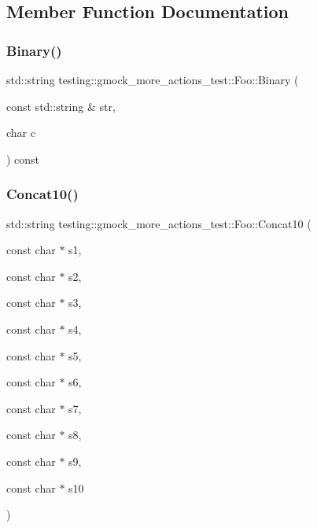 \subsection{Member Function Documentation}
\mbox{\label{classtesting_1_1gmock__more__actions__test_1_1Foo_a8ee56742c6c025af680617464c71ecef}} 
\subsubsection{\texorpdfstring{Binary()}{Binary()}}
{\footnotesize\ttfamily std\+::string testing\+::gmock\+\_\+more\+\_\+actions\+\_\+test\+::\+Foo\+::\+Binary (\begin{DoxyParamCaption}\item[{const std\+::string \&}]{str,  }\item[{char}]{c }\end{DoxyParamCaption}) const\hspace{0.3cm}{\ttfamily [inline]}}

\mbox{\label{classtesting_1_1gmock__more__actions__test_1_1Foo_ad5b1d2dd1bcec98fdc90a05487ec3b14}} 
\subsubsection{\texorpdfstring{Concat10()}{Concat10()}}
{\footnotesize\ttfamily std\+::string testing\+::gmock\+\_\+more\+\_\+actions\+\_\+test\+::\+Foo\+::\+Concat10 (\begin{DoxyParamCaption}\item[{const char $\ast$}]{s1,  }\item[{const char $\ast$}]{s2,  }\item[{const char $\ast$}]{s3,  }\item[{const char $\ast$}]{s4,  }\item[{const char $\ast$}]{s5,  }\item[{const char $\ast$}]{s6,  }\item[{const char $\ast$}]{s7,  }\item[{const char $\ast$}]{s8,  }\item[{const char $\ast$}]{s9,  }\item[{const char $\ast$}]{s10 }\end{DoxyParamCaption})\hspace{0.3cm}{\ttfamily [inline]}}


